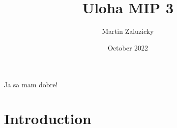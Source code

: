 \documentclass{article}
\title{Uloha MIP 3}
\author{Martin Zaluzicky}
\date{October 2022}
\begin{document}
Ja sa mam dobre!
\maketitle

\section{Introduction}
\end{document}
